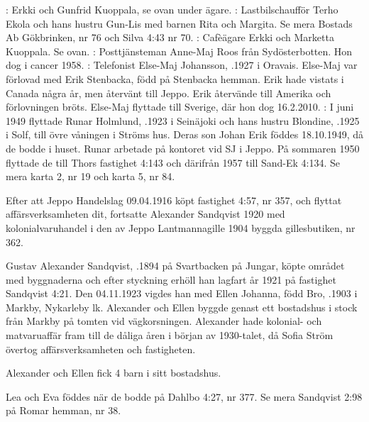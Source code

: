 :  Erkki och Gunfrid Kuoppala, se ovan under ägare.
:  Lastbilschaufför Terho Ekola och hans hustru Gun-Lis med barnen Rita och Margita. Se mera Bostads Ab Gökbrinken, nr 76 och Silva 4:43 nr 70.
:  Cafèägare Erkki och Marketta Kuoppala. Se ovan.
:  Posttjänsteman Anne-Maj Roos från Sydösterbotten. Hon dog i cancer 1958.
:  Telefonist Else-Maj Johansson, .1927 i Oravais. Else-Maj var förlovad med Erik Stenbacka, född på Stenbacka hemman. Erik hade vistats i Canada några år, men återvänt till Jeppo. Erik återvände till Amerika och förlovningen bröts. Else-Maj flyttade till Sverige, där hon dog 16.2.2010.
:  I juni 1949 flyttade Runar Holmlund, .1923 i Seinäjoki och hans hustru Blondine, .1925 i Solf, till övre våningen i Ströms hus. Deras son Johan Erik föddes 18.10.1949, då de bodde i huset. Runar arbetade på kontoret vid SJ i Jeppo. På sommaren 1950 flyttade de till Thors fastighet 4:143 och därifrån 1957 till Sand-Ek 4:134. Se mera karta 2, nr 19 och karta 5, nr 84.


%
Efter att Jeppo Handelslag 09.04.1916 köpt fastighet 4:57, nr	357, och flyttat affärsverksamheten dit, fortsatte Alexander Sandqvist	1920 med kolonialvaruhandel i den av Jeppo Lantmannagille 1904 byggda gillesbutiken, nr 362.


Gustav Alexander Sandqvist, .1894 på Svartbacken på Jungar, köpte området med byggnaderna och efter styckning	erhöll han lagfart år 1921 på fastighet Sandqvist 4:21. Den 04.11.1923 vigdes han med Ellen Johanna, född Bro, .1903 i Markby, Nykarleby lk. Alexander och Ellen byggde genast ett bostadshus i stock från Markby på tomten vid vägkorsningen. Alexander hade kolonial- och matvaruaffär fram till de dåliga åren i början av 1930-talet, då Sofia Ström övertog affärsverksamheten och fastigheten.

Alexander och Ellen fick 4 barn i sitt bostadshus.
\begin{jhchildren}
  \item {}
  \item {}
  \item {}
  \item {}
\end{jhchildren}
Lea och Eva föddes när de bodde på Dahlbo 4:27, nr 377. Se mera Sandqvist 2:98 på Romar hemman, nr 38.

